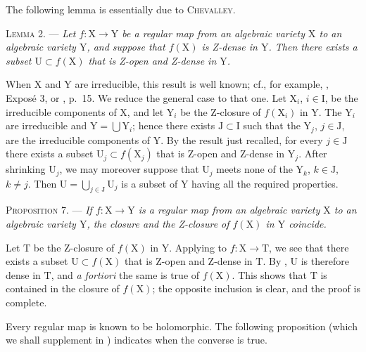 The following lemma is essentially due to \textsc{Chevalley}.

\textsc{Lemma 2}. --- \emph{Let $f:\mathrm{X}\to \mathrm{Y}$ be a regular map from an algebraic variety $\mathrm{X}$ to an algebraic variety $\mathrm{Y}$, and suppose that $f(\mathrm{X})$ is Z-dense in $\mathrm{Y}$. Then there exists a subset $\mathrm{U}\subset f(\mathrm{X})$ that is Z-open and Z-dense in $\mathrm{Y}$.}

When $\mathrm{X}$ and $\mathrm{Y}$ are irreducible, this result is well known; cf., for example, , Expos\'e 3, or , p.~15. We reduce the general case to that one. Let $\mathrm{X}_i$, $i\in \mathrm{I}$, be the irreducible components of $\mathrm{X}$, and let $\mathrm{Y}_i$ be the Z-closure of $f(\mathrm{X}_i)$ in $\mathrm{Y}$. The $\mathrm{Y}_i$ are irreducible and $\mathrm{Y}=\bigcup \mathrm{Y}_i$; hence there exists $\mathrm{J}\subset \mathrm{I}$ such that the $\mathrm{Y}_j$, $j\in \mathrm{J}$, are the irreducible components of $\mathrm{Y}$. By the result just recalled, for every $j\in \mathrm{J}$ there exists a subset $\mathrm{U}_j\subset f(\mathrm{X}_j)$ that is Z-open and Z-dense in $\mathrm{Y}_j$. After shrinking $\mathrm{U}_j$, we may moreover suppose that $\mathrm{U}_j$ meets none of the $\mathrm{Y}_k$, $k\in \mathrm{J}$, $k\neq j$. Then $\mathrm{U}=\bigcup_{j\in \mathrm{J}}\mathrm{U}_j$ is a subset of $\mathrm{Y}$ having all the required properties.

\textsc{Proposition 7}. --- \emph{If $f:\mathrm{X}\to \mathrm{Y}$ is a regular map from an algebraic variety $\mathrm{X}$ to an algebraic variety $\mathrm{Y}$, the closure and the Z-closure of $f(\mathrm{X})$ in $\mathrm{Y}$ coincide.}

Let $\mathrm{T}$ be the Z-closure of $f(\mathrm{X})$ in $\mathrm{Y}$. Applying  to $f:\mathrm{X}\to \mathrm{T}$, we see that there exists a subset $\mathrm{U}\subset f(\mathrm{X})$ that is Z-open and Z-dense in $\mathrm{T}$. By , $\mathrm{U}$ is therefore dense in $\mathrm{T}$, and \emph{a fortiori} the same is true of $f(\mathrm{X})$. This shows that $\mathrm{T}$ is contained in the closure of $f(\mathrm{X})$; the opposite inclusion is clear, and the proof is complete.


Every regular map is known to be holomorphic. The following proposition (which we shall supplement in ) indicates when the converse is true.

